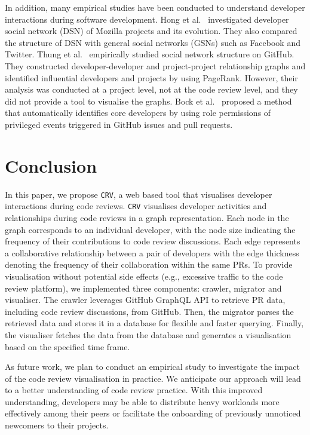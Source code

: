 \documentclass[sigconf]{acmart}
\newcommand{\service}{{\tt CRV}\xspace}
\begin{document}
In addition, many empirical studies have been conducted to understand developer interactions during software development.
Hong et al.~\cite{Hong11} investigated developer social network (DSN) of Mozilla projects and its evolution.
They also compared the structure of DSN with general social networks (GSNs) such as Facebook and Twitter.
Thung et al.~\cite{Thung13} empirically studied social network structure on GitHub.
They constructed developer-developer and project-project relationship graphs and identified influential developers and projects by using PageRank.
However, their analysis was conducted at a project level, not at the code review level, and they did not provide a tool to visualise the graphs.
Bock et al.~\cite{Bock23} proposed a method that automatically identifies core developers by using role permissions of privileged events triggered in GitHub issues and pull requests.


\section{Conclusion}
\label{sec:conclusion}

In this paper, we propose \service, a web based tool that visualises developer interactions during code reviews.
\service visualises developer activities and relationships during code reviews in a graph representation.
Each node in the graph corresponds to an individual developer, with the node size indicating the frequency of their contributions to code review discussions.
Each edge represents a collaborative relationship between a pair of developers with the edge thickness denoting the frequency of their collaboration within the same PRs.
To provide visualisation without potential side effects (e.g., excessive traffic to the code review platform), we implemented three components: crawler, migrator and visualiser.
The crawler leverages GitHub GraphQL API to retrieve PR data, including code review discussions, from GitHub.
Then, the migrator parses the retrieved data and stores it in a database for flexible and faster querying.
Finally, the visualiser fetches the data from the database and generates a visualisation based on the specified time frame.

As future work, we plan to conduct an empirical study to investigate the impact of the code review visualisation in practice.
We anticipate our approach will lead to a better understanding of code review practice.
With this improved understanding, developers may be able to distribute heavy workloads more effectively among their peers or facilitate the onboarding of previously unnoticed newcomers to their projects.
\end{document}
